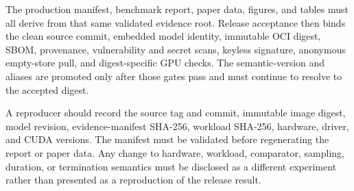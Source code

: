 The production manifest, benchmark report, paper data, figures, and tables must
all derive from that same validated evidence root. Release acceptance then
binds the clean source commit, embedded model identity, immutable OCI digest,
SBOM, provenance, vulnerability and secret scans, keyless signature, anonymous
empty-store pull, and digest-specific GPU checks. The semantic-version and
 aliases are promoted only after those gates pass and must continue
to resolve to the accepted digest.

A reproducer should record the source tag and commit, immutable image digest,
model revision, evidence-manifest SHA-256, workload SHA-256, hardware, driver,
and CUDA versions. The manifest must be validated before regenerating the
report or paper data. Any change to hardware, workload, comparator, sampling,
duration, or termination semantics must be disclosed as a different experiment
rather than presented as a reproduction of the release result.

